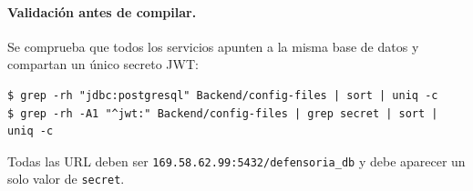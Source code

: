 \paragraph{Validación antes de compilar.} Se comprueba que todos los servicios apunten a la misma base de datos y compartan un único secreto JWT:
\begin{lstlisting}
$ grep -rh "jdbc:postgresql" Backend/config-files | sort | uniq -c
$ grep -rh -A1 "^jwt:" Backend/config-files | grep secret | sort | uniq -c
\end{lstlisting}
Todas las URL deben ser \texttt{169.58.62.99:5432/defensoria\_db} y debe aparecer un solo valor de \texttt{secret}.

